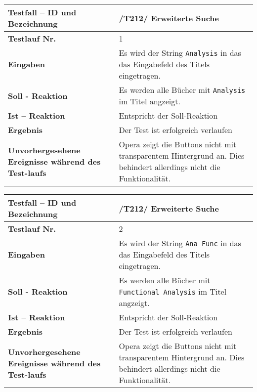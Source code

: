 \begin{longtable}{|p{5cm}|p{10cm}|}
\hline
\textbf{Testfall -- ID und Bezeichnung} & \textnormal{/T212/ Erweiterte
Suche} \\
\hline
\textbf{Testlauf Nr.} & \textnormal{1} \\
\hline
\textbf{Eingaben} & \textnormal{Es wird der String \lstinline{Analysis} in das
das Eingabefeld des Titels eingetragen.} \\
\hline
\textbf{Soll - Reaktion} & \textnormal{Es werden alle Bücher mit
\lstinline{Analysis} im Titel angzeigt.
} \\
\hline
\textbf{Ist -- Reaktion} & \textnormal{Entspricht der Soll-Reaktion} \\
\hline
\textbf{Ergebnis} & \textnormal{Der Test ist erfolgreich verlaufen} \\
\hline
\textbf{Unvorhergesehene Ereignisse w\"ahrend des Test-laufs } &
\textnormal{Opera zeigt die Buttons nicht mit transparentem Hintergrund an. Dies
behindert allerdings nicht die Funktionalität.} \\
\hline
\end{longtable}

\begin{longtable}{|p{5cm}|p{10cm}|}
\hline
\textbf{Testfall -- ID und Bezeichnung} & \textnormal{/T212/ Erweiterte
Suche} \\
\hline
\textbf{Testlauf Nr.} & \textnormal{2} \\
\hline
\textbf{Eingaben} & \textnormal{Es wird der String \lstinline{Ana Func} in das
das Eingabefeld des Titels eingetragen.} \\
\hline
\textbf{Soll - Reaktion} & \textnormal{Es werden alle Bücher mit
\lstinline{Functional Analysis} im Titel angzeigt.
} \\
\hline
\textbf{Ist -- Reaktion} & \textnormal{Entspricht der Soll-Reaktion} \\
\hline
\textbf{Ergebnis} & \textnormal{Der Test ist erfolgreich verlaufen} \\
\hline
\textbf{Unvorhergesehene Ereignisse w\"ahrend des Test-laufs } &
\textnormal{Opera zeigt die Buttons nicht mit transparentem Hintergrund an. Dies
behindert allerdings nicht die Funktionalität.} \\
\hline
\end{longtable}


